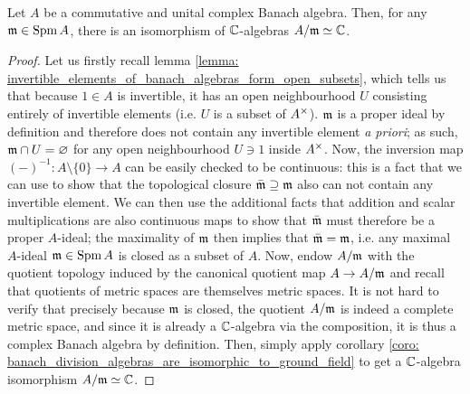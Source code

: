         \begin{proposition} \label{prop: residue_fields_of_commutative_banach_algebras}
            Let $A$ be a commutative and unital complex Banach algebra. Then, for any $\mathfrak{m} \in \operatorname{Spm} A$, there is an isomorphism of $\mathbb{C}$-algebras $A/\mathfrak{m} \simeq \mathbb{C}$. 
        \end{proposition}
            \begin{proof}
                Let us firstly recall lemma \ref{lemma: invertible_elements_of_banach_algebras_form_open_subsets}, which tells us that because $1 \in A$ is invertible, it has an open neighbourhood $U$ consisting entirely of invertible elements (i.e. $U$ is a subset of $A^{\x}$). $\mathfrak{m}$ is a proper ideal by definition and therefore does not contain any invertible element \textit{a priori}; as such, $\mathfrak{m} \cap U = \varnothing$ for any open neighbourhood $U \ni 1$ inside $A^{\x}$. Now, the inversion map $(-)^{-1}: A \setminus \{0\} \to A$ can be easily checked to be continuous: this is a fact that we can use to show that the topological closure $\bar{\mathfrak{m}} \supseteq \mathfrak{m}$ also can not contain any invertible element. We can then use the additional facts that addition and scalar multiplications are also continuous maps to show that $\bar{\mathfrak{m}}$ must therefore be a proper $A$-ideal; the maximality of $\mathfrak{m}$ then implies that $\bar{\mathfrak{m}} = \mathfrak{m}$, i.e. any maximal $A$-ideal $\mathfrak{m} \in \operatorname{Spm} A$ is closed as a subset of $A$. Now, endow $A/\mathfrak{m}$ with the quotient topology induced by the canonical quotient map $A \to A/\mathfrak{m}$ and recall that quotients of metric spaces are themselves metric spaces. It is not hard to verify that precisely because $\mathfrak{m}$ is closed, the quotient $A/\mathfrak{m}$ is indeed a complete metric space, and since it is already a $\mathbb{C}$-algebra via the composition, it is thus a complex Banach algebra by definition. Then, simply apply corollary \ref{coro: banach_division_algebras_are_isomorphic_to_ground_field} to get a $\mathbb{C}$-algebra isomorphism $A/\mathfrak{m} \simeq \mathbb{C}$.
            \end{proof}
            
